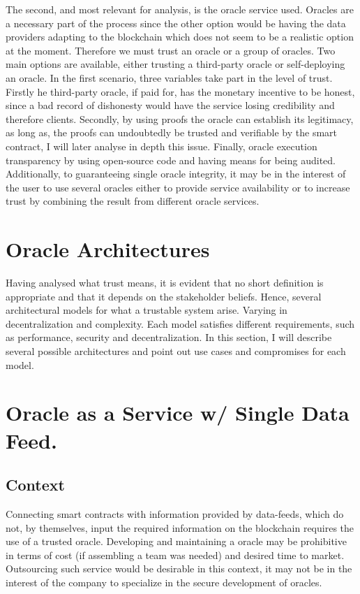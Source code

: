 The second, and most relevant for analysis, is the oracle service used. Oracles are a necessary part of the process since the other option would be having the data providers adapting to the blockchain which does not seem to be a realistic option at the moment. Therefore we must trust an oracle or a group of oracles. Two main options are available, either trusting a third-party oracle or self-deploying an oracle. In the first scenario, three variables take part in the level of trust. Firstly he third-party oracle, if paid for, has the monetary incentive to be honest, since a bad record of dishonesty would have the service losing credibility and therefore clients. Secondly, by using proofs the oracle can establish its legitimacy, as long as, the proofs can undoubtedly be trusted and verifiable by the smart contract, I will later analyse in depth this issue. Finally, oracle execution transparency by using open-source code and having means for being audited. Additionally, to guaranteeing single oracle integrity, it may be in the interest of the user to use several oracles either to provide service availability or to increase trust by combining the result from different oracle services.


\section{Oracle Architectures}

Having analysed what trust means, it is evident that no short definition is appropriate and that it depends on the stakeholder beliefs. Hence, several architectural models for what a trustable system arise. Varying in decentralization and complexity. Each model satisfies different requirements, such as performance, security and decentralization.
In this section, I will describe several possible architectures and point out use cases and compromises for each model.


\section{Oracle as a Service w/ Single Data Feed.}\label{OaaSwSingleDataFeed}

\subsection{Context}
Connecting smart contracts with information provided by data-feeds, which do not, by themselves, input the required information on the blockchain requires the use of a trusted oracle. Developing and maintaining a oracle may be prohibitive in terms of cost (if assembling a team was needed) and desired time to market. Outsourcing such service would be desirable in this context, it may not be in the interest of the company to specialize in the secure development of oracles.

